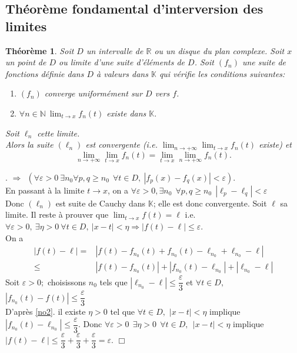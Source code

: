 \documentclass[11pt, a4paper]{book}
\newtheorem{teo}{Th\'eor\`eme}[section]
\newenvironment{pr}{\noindent {\bf Preuve} \noindent} {\hfill $\Box$\vskip 5mm}
\begin{document}
\subsection{Th\'eor\`eme fondamental d'interversion des limites}
\begin{teo} \label{teo4.3.2}
Soit $D$ un intervalle de $ \mathbb{R}$ ou un disque du plan complexe. Soit $x$ un point de $D$ ou limite d'une suite d'\'el\'ements de $D$. Soit $(f_n)$ une suite de fonctions d\'efinie dans $D$ \`a valeurs dans $ \mathbb{K}$ qui v\'erifie les conditions suivantes:
\begin{enumerate}
\item  $(f_n)$ converge uniform\'ement sur $D$ vers $f$.
\item  \label{no2} $ \forall n\in \mathbb{N} ~{\displaystyle \lim_{t\rightarrow x} f_n(t)}$ existe dans $ \mathbb{K}.$
\end{enumerate}
Soit $\ell_n$ cette limite.\\
Alors la suite $(\ell_n)$ est convergente (i.e. ${\displaystyle \lim_{n\rightarrow +\infty}\lim_{t\rightarrow x} f_n(t)}$ existe) et $$\lim_{n\rightarrow +\infty}\lim_{t\rightarrow x} f_n(t)=\lim_{t\rightarrow x}\lim_{n\rightarrow +\infty}f_n(t).$$
\end{teo}
\begin{pr}. $\Longrightarrow ~~(\forall \varepsilon>0~\exists n_0 \forall p,q\geq n_0 ~~\forall t\in D, ~|f_p(x)-f_q(x)|<\varepsilon)$. \\
En passant \`a la limite $t\rightarrow x$, on a $ \forall \varepsilon >0, \exists n_0 ~~\forall p,q\geq n_0~~ |\ell_p-\ell_q|<\varepsilon$\\
Donc $(\ell_n)$ est suite de Cauchy dans $ \mathbb{K}$; elle est donc convergente. Soit $\ell$ sa limite. Il reste \`a prouver que ${\displaystyle \lim_{t\rightarrow x}f(t)=\ell}$ i.e. $\forall \varepsilon>0,~\exists \eta>0 ~\forall t\in D,~|x-t|<\eta \Rightarrow |f(t)-\ell|\leq \varepsilon$. \\
On a 
\begin{align*}
|f(t)-\ell|= & |f(t)-f_{n_{0}}(t)+f_{n_{0}}(t)-\ell_{n_{0}}+\ell_{n_{0}}-\ell|\\
\leq & |f(t)-f_{n_{0}}(t)|+|f_{n_{0}}(t)-\ell_{n_{0}}|+|\ell_{n_{0}}-\ell|
\end{align*}
Soit $\varepsilon >0;$ 
choisissons $n_{0}$ tels que $|\ell_{n_{0}}-\ell|\leq \dfrac{\varepsilon}{3}$ 
et $\forall t\in D,$ $|f_{n_{0}}(t)-f(t)|\leq \dfrac{\varepsilon}{3}$\\
D'apr\`es \ref{no2}. il existe $\eta >0$ tel que $\forall t\in D,$ $|x-t|< \eta$ implique $|f_{n_{0}}(t)-\ell_{n_{0}}|\leq \dfrac{\varepsilon}{3}.$ Donc $\forall \varepsilon >0 ~~\exists \eta >0~~\forall t\in D,~~|x-t|<\eta$ implique $|f(t)-\ell|\leq \dfrac{\varepsilon}{3}+\dfrac{\varepsilon}{3}+\dfrac{\varepsilon}{3}=\varepsilon$. 
\end{pr}
\end{document}
